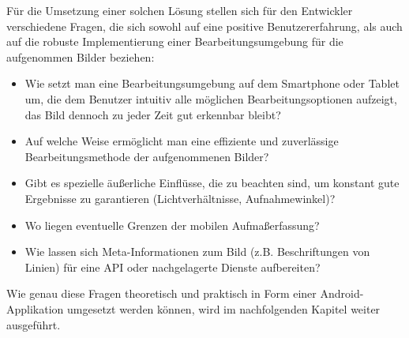 Für die Umsetzung einer solchen Lösung stellen sich für den Entwickler verschiedene Fragen, die sich sowohl auf eine positive Benutzererfahrung, als auch auf die robuste Implementierung einer Bearbeitungsumgebung für die aufgenommen Bilder beziehen:

\begin{itemize}
	\item Wie setzt man eine Bearbeitungsumgebung auf dem Smartphone oder Tablet um, die dem Benutzer intuitiv alle möglichen Bearbeitungsoptionen aufzeigt, das Bild dennoch zu jeder Zeit gut erkennbar bleibt?
	\item Auf welche Weise ermöglicht man eine effiziente und zuverlässige Bearbeitungsmethode der aufgenommenen Bilder?
	\item Gibt es spezielle äußerliche Einflüsse, die zu beachten sind, um konstant gute Ergebnisse zu garantieren (Lichtverhältnisse, Aufnahmewinkel)?
	\item Wo liegen eventuelle Grenzen der mobilen Aufmaßerfassung?
	\item Wie lassen sich Meta-Informationen zum Bild (z.B. Beschriftungen von Linien) für eine API oder nachgelagerte Dienste aufbereiten?
\end{itemize}

Wie genau diese Fragen theoretisch und praktisch in Form einer Android-Applikation umgesetzt werden können, wird im nachfolgenden Kapitel weiter ausgeführt. 
